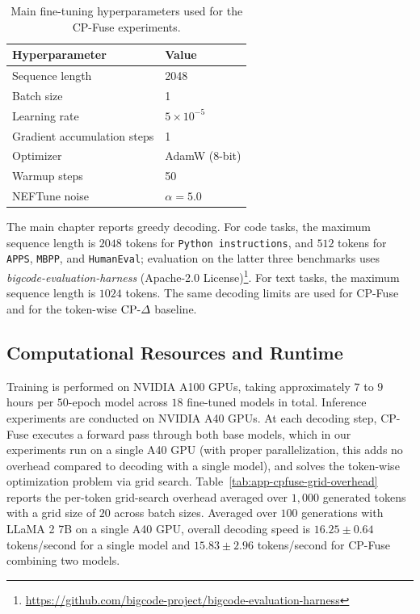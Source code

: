 \begin{table}[!tbp]
\centering
\caption{Main fine-tuning hyperparameters used for the CP-Fuse experiments.}
\label{tab:app-cpfuse-training}
\begin{tabular}{ll}
\toprule
\textbf{Hyperparameter} & \textbf{Value} \\
\midrule
Sequence length & 2048 \\
Batch size & 1 \\
Learning rate & \(5\times 10^{-5}\) \\
Gradient accumulation steps & 1 \\
Optimizer & AdamW (8-bit) \\
Warmup steps & 50 \\
NEFTune noise & \(\alpha = 5.0\) \\
\bottomrule
\end{tabular}
\end{table}

The main chapter reports greedy decoding. For code tasks, the maximum sequence length is \(2048\) tokens for \texttt{Python instructions}, and \(512\) tokens for \texttt{APPS}, \texttt{MBPP}, and \texttt{HumanEval}; evaluation on the latter three benchmarks uses \emph{bigcode-evaluation-harness} (Apache-2.0 License)\footnote{\href{https://github.com/bigcode-project/bigcode-evaluation-harness}{https://github.com/bigcode-project/bigcode-evaluation-harness}}. For text tasks, the maximum sequence length is \(1024\) tokens. The same decoding limits are used for CP-Fuse and for the token-wise \(\text{CP-}\Delta\) baseline.

\subsection{Computational Resources and Runtime}
\label{app:cpfuse-compute}

Training is performed on NVIDIA A100 GPUs, taking approximately \(7\) to \(9\) hours per \(50\)-epoch model across \(18\) fine-tuned models in total. Inference experiments are conducted on NVIDIA A40 GPUs. At each decoding step, CP-Fuse executes a forward pass through both base models, which in our experiments run on a single A40 GPU (with proper parallelization, this adds no overhead compared to decoding with a single model), and solves the token-wise optimization problem via grid search. Table~\ref{tab:app-cpfuse-grid-overhead} reports the per-token grid-search overhead averaged over \(1{,}000\) generated tokens with a grid size of \(20\) across batch sizes. Averaged over \(100\) generations with LLaMA 2 7B on a single A40 GPU, overall decoding speed is \(16.25 \pm 0.64\) tokens/second for a single model and \(15.83 \pm 2.96\) tokens/second for CP-Fuse combining two models.

